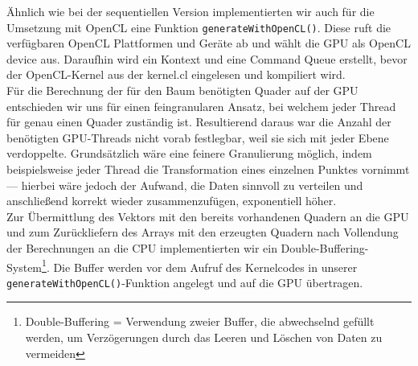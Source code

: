 \vspace{0.25cm}
Ähnlich wie bei der sequentiellen Version implementierten wir auch für die Umsetzung mit OpenCL eine Funktion 
\lstinline{generateWithOpenCL()}. Diese ruft die verfügbaren OpenCL Plattformen und Geräte ab und wählt die GPU als OpenCL device aus. 
Daraufhin wird ein Kontext und eine Command Queue erstellt, bevor der OpenCL-Kernel aus der kernel.cl eingelesen und kompiliert
wird. \\
Für die Berechnung der für den Baum benötigten Quader auf der GPU entschieden wir uns für einen feingranularen Ansatz, bei
welchem jeder Thread für genau einen Quader zuständig ist. Resultierend daraus war die Anzahl der benötigten GPU-Threads nicht vorab
festlegbar, weil sie sich mit jeder Ebene verdoppelte.
Grundsätzlich wäre eine feinere Granulierung möglich, indem beispielsweise
jeder Thread die Transformation eines einzelnen Punktes vornimmt --- hierbei wäre jedoch der Aufwand, die Daten sinnvoll zu verteilen
und anschließend korrekt wieder zusammenzufügen, exponentiell höher.\\
Zur Übermittlung des Vektors mit den bereits vorhandenen Quadern an die GPU und zum Zurückliefern des Arrays mit den erzeugten Quadern
nach Vollendung der Berechnungen an die CPU implementierten wir ein Double-Buffering-System\footnote{Double-Buffering = Verwendung 
zweier Buffer, die abwechselnd gefüllt werden, um Verzögerungen durch das Leeren und Löschen von Daten zu vermeiden}. 
Die Buffer werden vor dem Aufruf des Kernelcodes in unserer \lstinline{generateWithOpenCL()}-Funktion angelegt und auf die GPU übertragen. 

